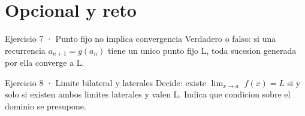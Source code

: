 \documentclass[10pt,a4paper,oneside,openany]{book}
\begin{document}
\section*{Opcional y reto}
\begin{PSevenOptionalFixed}{Ejercicio 7 · Punto fijo no implica convergencia}
Verdadero o falso: si una recurrencia \(a_{n+1}=g(a_n)\) tiene un unico punto fijo L, toda sucesion generada por ella converge a L.
\end{PSevenOptionalFixed}
\begin{PSevenOptionalFixed}{Ejercicio 8 · Limite bilateral y laterales}
Decide: existe \(\lim_{x\to a}\) \(f(x)=L\) si y solo si existen ambos limites laterales y valen L. Indica que condicion sobre el dominio se presupone.
\end{PSevenOptionalFixed}
\end{document}

